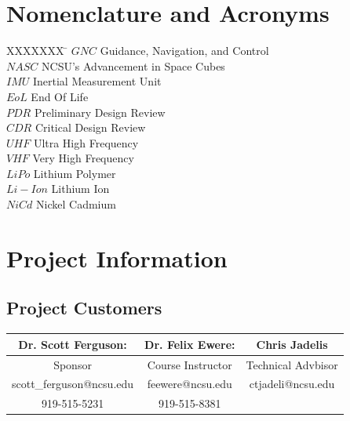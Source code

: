 \section*{Nomenclature and Acronyms}

\begin{tabbing}
  XXXXXXX \= \kill%
  $GNC$ \> Guidance, Navigation, and Control \\
  $NASC$ \> NCSU's Advancement in Space Cubes \\
  $IMU$ \> Inertial Measurement Unit \\
  $EoL$ \> End Of Life \\
  $PDR$ \> Preliminary Design Review \\
  $CDR$ \> Critical Design Review \\
  $UHF$ \> Ultra High Frequency \\
  $VHF$ \> Very High Frequency \\
  $LiPo$ \> Lithium Polymer \\
  $Li-Ion$ \> Lithium Ion \\
  $NiCd$ \> Nickel Cadmium \\
  [5pt]
 \end{tabbing}
 
 \vspace{0.5mm}
\pagebreak
\section{Project Information}
\subsection{Project Customers}

\begin{center}
    \begin{tabular}{|c||c||c|}
        \hline
         \textbf{Dr. Scott Ferguson:} & \textbf{Dr. Felix Ewere:} & \textbf{Chris Jadelis} \\
         \hline
         Sponsor & Course Instructor & Technical Advbisor \\
         \hline
         scott\_ferguson@ncsu.edu & feewere@ncsu.edu & ctjadeli@ncsu.edu \\
         \hline
         919-515-5231 & 919-515-8381 &  \\
         \hline
    \end{tabular}

\end{center}


